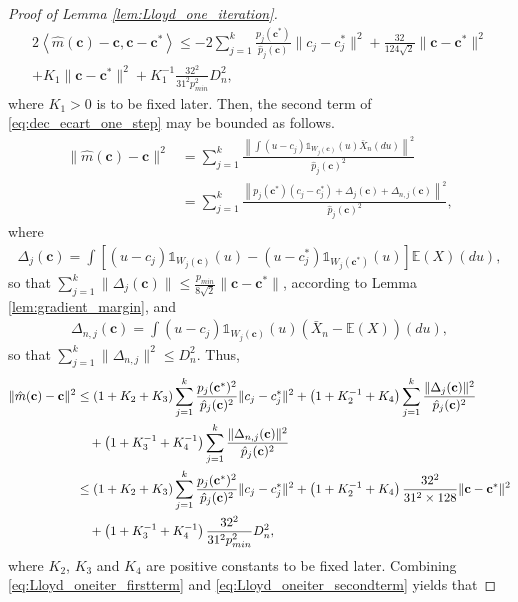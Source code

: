 \documentclass[noinfoline,preprint]{article}
\newcommand{\cb}{\mathbf{c}}
\newcommand{\E}{\mathbb{E}}
\renewcommand{\1}{\mathds 1}
\begin{document}
\begin{proof}[Proof of Lemma \ref{lem:Lloyd_one_iteration}]
\begin{multline}
2 \left\langle\hat{m}(\cb) - \cb,\cb-\cb^*\right\rangle \leq -2 \sum_{j=1}^k \frac{p_j(\cb^*)}{\hat{p}_j(\cb)} \| c_j -c_j^*\|^2 + \frac{32}{124 \sqrt{2}} \| \cb - \cb^*\|^2 \\
 + K_1 \| \cb - \cb^*\|^2 + K_1^{-1}\frac{32^2}{31^2p_{min}^2}D_n^2,
\end{multline}
where $K_1 >0$ is to be fixed later. Then, the second term of \eqref{eq:dec_ecart_one_step} may be bounded as follows.
\begin{align*}
\|\hat{m}(\cb) - \cb\|^2 & = \sum_{j=1}^k \frac{\left \| \int (u-c_j)\1_{W_j(\cb)}(u)\bar{X}_n(du) \right \|^2}{\hat{p}_j(\cb)^2}  \\
           & = \sum_{j=1}^k \frac{\left \| p_j(\cb^*)(c_j-c_j^*) + \Delta_j(\cb) + \Delta_{n,j}(\cb) \right \|^2}{\hat{p}_j(\cb)^2},
\end{align*}
where
\begin{align*}
\Delta_j(\cb) =  \int \left [ (u-c_j)\1_{W_j(\cb)}(u)-(u-c_j^*)\1_{W_j(\cb^*)}(u) \right ]\E(X)(du),
\end{align*}
so that $\sum_{j=1}^{k} \|\Delta_j(\cb)\| \leq \frac{p_{min}}{8\sqrt{2}} \| \cb - \cb^*\|$, according to Lemma \ref{lem:gradient_margin}, and 
\begin{align*}
\Delta_{n,j}(\cb) = \int(u-c_j)\1_{W_j(\cb)}(u)(\bar{X}_n - \E(X))(du),
\end{align*}
so that $\sum_{j=1}^k \| \Delta_{n,j}\|^2 \leq D_n^2$. Thus, 
\begin{align}\label{eq:Lloyd_oneiter_secondterm}
\| \hat{m}(\cb) - \cb\|^2 & \leq 
\left ( 1 + K_2 + K_3 \right ) \sum_{j=1}^k \frac{p_j(\cb^*)^2}{\hat{p}_j(\cb)^2} \| c_j - c_j^*\|^2 + \left ( 1 + K_2^{-1} + K_4 \right ) \sum_{j=1}^{k} \frac{\|\Delta_j(\cb)\|^2}{\hat{p}_j(\cb)^2} \notag \\ 
& \quad  + \left ( 1 + K_3^{-1} + K_4^{-1} \right ) \sum_{j=1}^{k} \frac{\|\Delta_{n,j}(\cb)\|^2}{\hat{p}_j(\cb)^2}  \notag \\
                          &\leq \left ( 1 + K_2 + K_3 \right ) \sum_{j=1}^k \frac{p_j(\cb^*)^2}{\hat{p}_j(\cb)^2} \| c_j - c_j^*\|^2  + \left ( 1 + K_2^{-1} + K_4 \right ) \frac{32^2}{31^2 \times 128} \|\cb - \cb^*\|^2  \notag \\
                    & \quad  + \left ( 1 + K_3^{-1} + K_4^{-1} \right ) \frac{32^2}{31^2 p_{min}^2}D_n^2,
\end{align}
where $K_2$, $K_3$ and  $K_4$ are positive constants to be fixed later. Combining \eqref{eq:Lloyd_oneiter_firstterm} and \eqref{eq:Lloyd_oneiter_secondterm} yields that

\end{proof}
\end{document}
